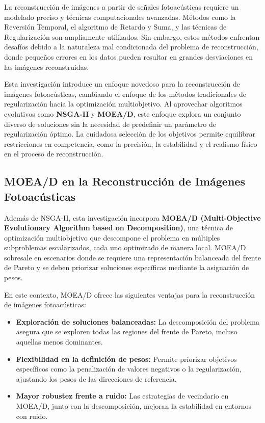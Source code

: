 La reconstrucción de imágenes a partir de señales fotoacústicas requiere un modelado preciso y técnicas computacionales avanzadas. Métodos como la Reversión Temporal, el algoritmo de Retardo y Suma, y las técnicas de Regularización son ampliamente utilizados. Sin embargo, estos métodos enfrentan desafíos debido a la naturaleza mal condicionada del problema de reconstrucción, donde pequeños errores en los datos pueden resultar en grandes desviaciones en las imágenes reconstruidas.

Esta investigación introduce un enfoque novedoso para la reconstrucción de imágenes fotoacústicas, cambiando el enfoque de los métodos tradicionales de regularización hacia la optimización multiobjetivo. Al aprovechar algoritmos evolutivos como \textbf{NSGA-II} y \textbf{MOEA/D}, este enfoque explora un conjunto diverso de soluciones sin la necesidad de predefinir un parámetro de regularización óptimo. La cuidadosa selección de los objetivos permite equilibrar restricciones en competencia, como la precisión, la estabilidad y el realismo físico en el proceso de reconstrucción.

\subsection*{MOEA/D en la Reconstrucción de Imágenes Fotoacústicas}

Además de NSGA-II, esta investigación incorpora \textbf{MOEA/D (Multi-Objective Evolutionary Algorithm based on Decomposition)}, una técnica de optimización multiobjetivo que descompone el problema en múltiples subproblemas escalarizados, cada uno optimizado de manera local. MOEA/D sobresale en escenarios donde se requiere una representación balanceada del frente de Pareto y se deben priorizar soluciones específicas mediante la asignación de pesos.

En este contexto, MOEA/D ofrece las siguientes ventajas para la reconstrucción de imágenes fotoacústicas:
\begin{itemize}
    \item \textbf{Exploración de soluciones balanceadas:} La descomposición del problema asegura que se exploren todas las regiones del frente de Pareto, incluso aquellas menos dominantes.
    \item \textbf{Flexibilidad en la definición de pesos:} Permite priorizar objetivos específicos como la penalización de valores negativos o la regularización, ajustando los pesos de las direcciones de referencia.
    \item \textbf{Mayor robustez frente a ruido:} Las estrategias de vecindario en MOEA/D, junto con la descomposición, mejoran la estabilidad en entornos con ruido.
\end{itemize}

